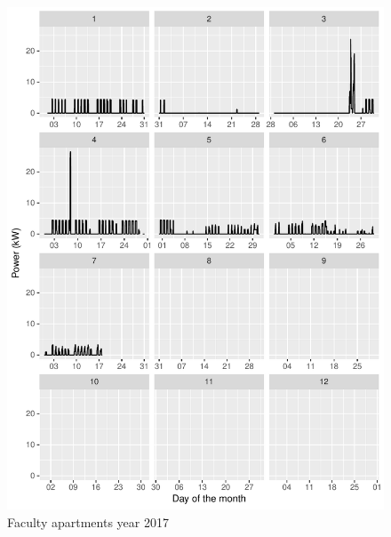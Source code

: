\documentclass[11pt, oneside]{article}   	%
\begin{document}
\begin{figure}
\includegraphics[keepaspectratio]{fac_build_Y2017.pdf}
\caption{Faculty apartments  year 2017 }
\end{figure}
\clearpage
\end{document}
